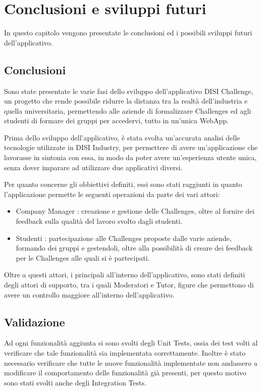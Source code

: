 \chapter{Conclusioni e sviluppi futuri}
\label{cha:conclusioni}
In questo capitolo vengono presentate le conclusioni ed i possibili sviluppi futuri dell'applicativo.

\section{Conclusioni}
Sono state presentate le varie fasi dello sviluppo dell'applicativo DISI Challenge, un progetto che rende possibile ridurre la distanza tra la realtà dell'industria e quella universitaria, permettendo alle aziende di formalizzare Challenges ed agli studenti di formare dei gruppi per accedervi, tutto in un'unica WebApp.

Prima dello sviluppo dell'applicativo, è stata svolta un'accurata analisi delle tecnologie utilizzate in DISI Industry, per permettere di avere un'applicazione che lavorasse in sintonia con essa, in modo da poter avere un'esperienza utente unica, senza dover imparare ad utilizzare due applicativi diversi.

Per quanto concerne gli obbiettivi definiti, essi sono stati raggiunti in quanto l'applicazione permette le seguenti operazioni da parte dei vari attori:
\begin{itemize}
    \item Company Manager : creazione e gestione delle Challenges, oltre al fornire dei feedback sulla qualità del lavoro svolto dagli studenti.
    \item Studenti : partecipazione alle Challenges proposte dalle varie aziende, formando dei gruppi e gestendoli, oltre alla possibilità di creare dei feedback per le Challenges alle quali si è partecipati.
\end{itemize}

Oltre a questi attori, i principali all'interno dell'applicativo, sono stati definiti degli attori di supporto, tra i quali Moderatori e Tutor, figure che permettono di avere un controllo maggiore all'interno dell'applicativo.



\section{Validazione}
Ad ogni funzionalità aggiunta si sono svolti degli Unit Tests, ossia dei test volti al verificare che tale funzionalità sia implementata correttamente. Inoltre è stato necessario verificare che tutte le nuove funzionalità implementate non andassero a modificare il comportamento delle funzionalità già presenti, per questo motivo sono stati svolti anche degli Integration Tests.

